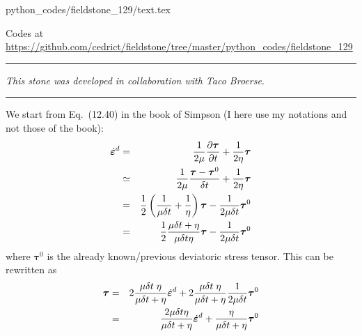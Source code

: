 \begin{flushright} {\tiny {\color{gray} python\_codes/fieldstone\_129/text.tex}} \end{flushright}



\begin{center}
Codes at \url{https://github.com/cedrict/fieldstone/tree/master/python_codes/fieldstone_129}
\end{center}

\par\noindent\rule{\textwidth}{0.4pt}

{\sl This stone was developed in collaboration with Taco Broerse}. 

\par\noindent\rule{\textwidth}{0.4pt}




We start from Eq.~(12.40) in the book of Simpson (I here use my notations
and not those of the book):
\begin{eqnarray}
\dot{\bm\varepsilon}^d
&=&\frac{1}{2\mu} \frac{\partial \bm\tau}{\partial t}
+\frac{1}{2\eta} \bm\tau \nonumber\\
&\simeq&
\frac{1}{2\mu} \frac{\bm\tau - \bm\tau^0}{\delta t}
+\frac{1}{2\eta} \bm\tau \nonumber\\
&=&
\frac12 \left( \frac{1}{\mu \delta t} + \frac{1}{\eta} \right) {\bm\tau}
-\frac{1}{2\mu \delta t} \bm\tau^0\nonumber\\
&=&
\frac12 \frac{ \mu\delta t +\eta}{\mu \delta t \eta}  {\bm\tau}
-\frac{1}{2\mu \delta t} \bm\tau^0
\end{eqnarray}
where ${\bm \tau}^0$ is the already known/previous deviatoric stress tensor. This can be rewritten as
\begin{eqnarray}
\bm\tau 
&=&
2  \frac{\mu \delta t \; \eta}{ \mu\delta t +\eta} \dot{\bm\varepsilon}^d 
+
2 \frac{\mu \delta t \; \eta}{\mu\delta t + \eta} \frac{1}{2\mu \delta t} \bm\tau^0
\nonumber\\
&=&
\frac{2 \mu \delta t \eta}{ \mu\delta t +\eta} \dot{\bm\varepsilon}^d 
+
\frac{ \eta}{\mu\delta t + \eta}  \bm\tau^0 \label{tau_simp1}
\end{eqnarray}

